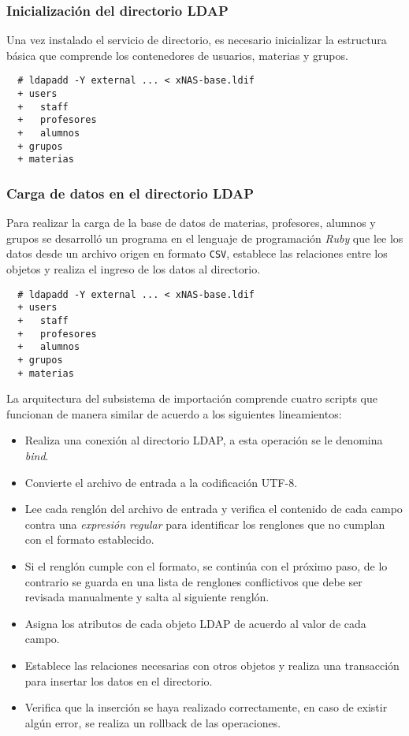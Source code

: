           \subsubsection {Inicializaci\'{o}n del directorio \textsc{LDAP}}

Una vez instalado el servicio de directorio, es necesario inicializar la estructura b\'{a}sica que comprende los contenedores de usuarios, materias y grupos. %

{
\scriptsize
\linespread{1}
\begin{verbatim}
  # ldapadd -Y external ... < xNAS-base.ldif
  + users
  +   staff
  +   profesores
  +   alumnos
  + grupos
  + materias
\end{verbatim}
}

          \subsubsection {Carga de datos en el directorio \textsc{LDAP}}

Para realizar la carga de la base de datos de materias, profesores, alumnos y grupos se desarroll\'{o} un programa en el lenguaje de programaci\'{o}n \textsl{Ruby} que lee los datos desde un archivo origen en formato \texttt{CSV}, establece las relaciones entre los objetos y realiza el ingreso de los datos al directorio.

{
\scriptsize
\linespread{1}
\begin{verbatim}
  # ldapadd -Y external ... < xNAS-base.ldif
  + users
  +   staff
  +   profesores
  +   alumnos
  + grupos
  + materias
\end{verbatim}
}

La arquitectura del subsistema de importaci\'{o}n comprende cuatro scripts que funcionan de manera similar de acuerdo a los siguientes lineamientos:

\begin{itemize}
  \item Realiza una conexi\'{o}n al directorio LDAP, a esta operaci\'{o}n se le denomina \textit{bind}.
  \item Convierte el archivo de entrada a la codificaci\'{o}n \textsc{UTF-8}.
  \item Lee cada rengl\'{o}n del archivo de entrada y verifica el contenido de cada campo contra una \textit{expresi\'{o}n regular} para identificar los renglones que no cumplan con el formato establecido.
  \item Si el rengl\'{o}n cumple con el formato, se contin\'{u}a con el pr\'{o}ximo paso, de lo contrario se guarda en una lista de renglones conflictivos que debe ser revisada manualmente y salta al siguiente rengl\'{o}n.
  \item Asigna los atributos de cada objeto LDAP de acuerdo al valor de cada campo.
  \item Establece las relaciones necesarias con otros objetos y realiza una transacci\'{o}n para insertar los datos en el directorio.
  \item Verifica que la inserci\'{o}n se haya realizado correctamente, en caso de existir alg\'{u}n error, se  realiza un rollback de las operaciones.
\end{itemize}

